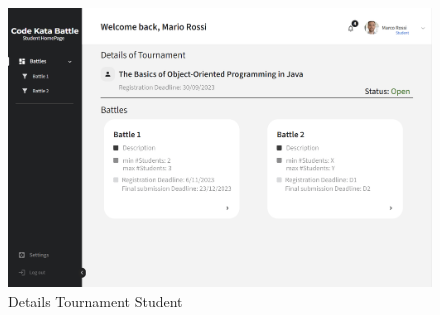 \begin{figure}[H]
    \centering
    \includegraphics[width=\textwidth]{../images/details-tournament-student.png}
    \caption{Details Tournament Student}
    \label{fig:Details Tournament Student}
\end{figure}



